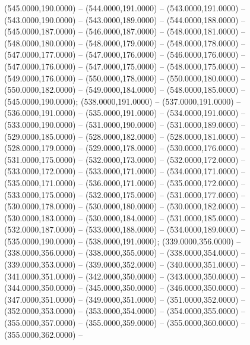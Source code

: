 \begin{scope}[shift={(-231.87,-121.87)}]
  \begin{scope}[draw=black,fill=cd7191c,line join=round,line width=0.208pt]
       (545.0000,190.0000) -- (544.0000,191.0000) --
        (543.0000,191.0000) -- (543.0000,190.0000) -- (543.0000,189.0000) --
        (544.0000,188.0000) -- (545.0000,187.0000) -- (546.0000,187.0000) --
        (548.0000,181.0000) -- (548.0000,180.0000) -- (548.0000,179.0000) --
        (548.0000,178.0000) -- (547.0000,177.0000) -- (547.0000,176.0000) --
        (546.0000,176.0000) -- (547.0000,176.0000) -- (547.0000,175.0000) --
        (548.0000,175.0000) -- (549.0000,176.0000) -- (550.0000,178.0000) --
        (550.0000,180.0000) -- (550.0000,182.0000) -- (549.0000,184.0000) --
        (548.0000,185.0000) -- (545.0000,190.0000);
       (538.0000,191.0000) -- (537.0000,191.0000) --
        (536.0000,191.0000) -- (535.0000,191.0000) -- (534.0000,191.0000) --
        (533.0000,190.0000) -- (531.0000,190.0000) -- (531.0000,189.0000) --
        (529.0000,185.0000) -- (528.0000,182.0000) -- (528.0000,181.0000) --
        (528.0000,179.0000) -- (529.0000,178.0000) -- (530.0000,176.0000) --
        (531.0000,175.0000) -- (532.0000,173.0000) -- (532.0000,172.0000) --
        (533.0000,172.0000) -- (533.0000,171.0000) -- (534.0000,171.0000) --
        (535.0000,171.0000) -- (536.0000,171.0000) -- (535.0000,172.0000) --
        (533.0000,175.0000) -- (532.0000,175.0000) -- (531.0000,177.0000) --
        (530.0000,178.0000) -- (530.0000,180.0000) -- (530.0000,182.0000) --
        (530.0000,183.0000) -- (530.0000,184.0000) -- (531.0000,185.0000) --
        (532.0000,187.0000) -- (533.0000,188.0000) -- (534.0000,189.0000) --
        (535.0000,190.0000) -- (538.0000,191.0000);
       (339.0000,356.0000) -- (338.0000,356.0000) --
        (338.0000,355.0000) -- (338.0000,354.0000) -- (339.0000,353.0000) --
        (339.0000,352.0000) -- (340.0000,351.0000) -- (341.0000,351.0000) --
        (342.0000,350.0000) -- (343.0000,350.0000) -- (344.0000,350.0000) --
        (345.0000,350.0000) -- (346.0000,350.0000) -- (347.0000,351.0000) --
        (349.0000,351.0000) -- (351.0000,352.0000) -- (352.0000,353.0000) --
        (353.0000,354.0000) -- (354.0000,355.0000) -- (355.0000,357.0000) --
        (355.0000,359.0000) -- (355.0000,360.0000) -- (355.0000,362.0000) --

\end{scope}
\end{scope}

